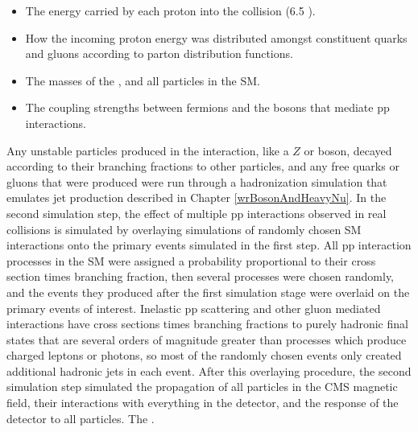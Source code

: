 \begin{itemize}
	\item The energy carried by each proton into the collision (6.5 \TeV).
	\item How the incoming proton energy was distributed amongst constituent quarks and gluons according 
		to parton distribution functions.
	\item The masses of the \WR, \nul and all particles in the SM.
	\item The coupling strengths between fermions and the bosons that mediate pp interactions.
\end{itemize}

Any unstable particles produced in the interaction, like a $Z$ or \WR boson, decayed according to 
their branching fractions to other particles, and any free quarks or gluons that were produced were 
run through a hadronization simulation that emulates jet production described in Chapter \ref{wrBosonAndHeavyNu}.  In the second 
simulation step, the effect of multiple pp interactions observed in real collisions is simulated by 
overlaying simulations of randomly chosen SM interactions onto the primary events simulated in the first 
step.  All pp interaction processes in the SM were assigned a probability proportional to their cross section 
times branching fraction, then several processes were chosen randomly, and the events they produced after 
the first simulation stage were overlaid on the primary events of interest.  Inelastic pp scattering and 
other gluon mediated interactions have cross sections times branching fractions to purely hadronic 
final states that are several orders of magnitude greater than processes which produce charged leptons 
or photons, so most of the randomly chosen events only created additional hadronic jets in each event.  After 
this overlaying procedure, the second simulation step simulated the propagation of all particles in 
the CMS magnetic field, their interactions with everything in the detector, and the response of the 
detector to all particles.  The .



